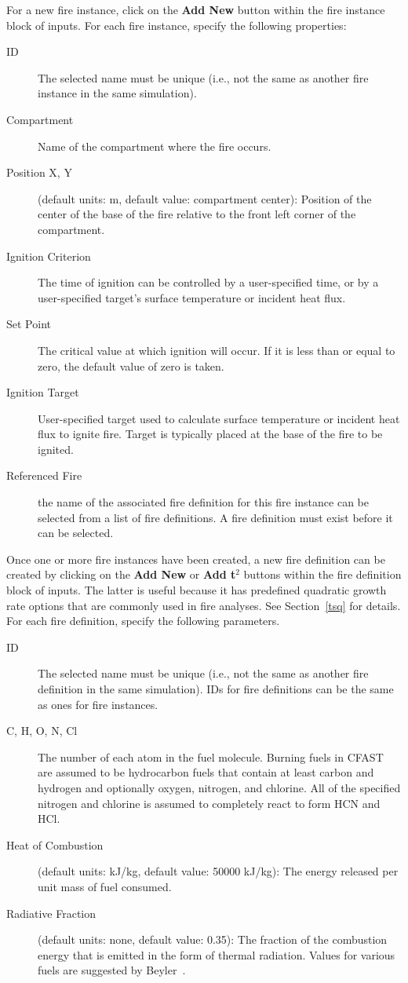 For a new fire instance, click on the {\bf Add New} button within the fire instance block of inputs.  For each fire instance, specify the following properties:
\begin{description}
\item[ID] The selected name must be unique (i.e., not the same as another fire instance in the same simulation).
\item[Compartment] Name of the compartment where the fire occurs.
\item[Position X, Y] (default units: m, default value: compartment center): Position of the center of the base of the fire relative to the front left corner of the compartment.
\item[Ignition Criterion] The time of ignition can be controlled by a user-specified time, or by a user-specified target's surface temperature or incident heat flux.
\item[Set Point] The critical value at which ignition will occur. If it is less than or equal to zero, the default value of zero is taken.
\item[Ignition Target] User-specified target used to calculate surface temperature or incident heat flux to ignite fire. Target is typically placed at the base of the fire to be ignited.
\item[Referenced Fire] the name of the associated fire definition for this fire instance can be selected from a list of fire definitions. A fire definition must exist before it can be selected.
\end{description}

Once one or more fire instances have been created, a new fire definition can be created by clicking on the {\bf Add New} or {\bf Add t$^2$} buttons within the fire definition block of inputs. The latter is useful because it has predefined quadratic growth rate options that are commonly used in fire analyses. See Section~\ref{tsq} for details. For each fire definition, specify the following parameters.
\begin{description}
\item[ID] The selected name must be unique (i.e., not the same as another fire definition in the same simulation). IDs for fire definitions can be the same as ones for fire instances.
\item[C, H, O, N, Cl] The number of each atom in the fuel molecule. Burning fuels in CFAST are assumed to be hydrocarbon fuels that contain at least carbon and hydrogen and optionally oxygen, nitrogen, and chlorine. All of the specified nitrogen and chlorine is assumed to completely react to form HCN and HCl.
\item[Heat of Combustion] (default units: kJ/kg, default value: 50000 kJ/kg): The energy released per unit mass of fuel consumed.
\item[Radiative Fraction] (default units: none, default value: 0.35): The fraction of the combustion energy that is emitted in the form of thermal radiation. Values for various fuels are suggested by Beyler~\cite{Beyler2:SFPE}.
\end{description}



